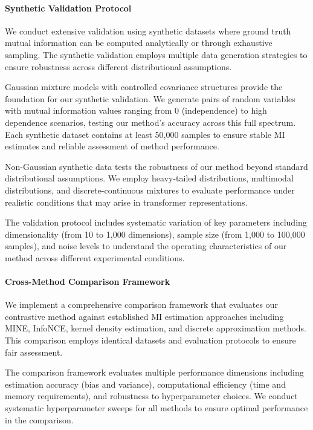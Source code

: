 \paragraph{Synthetic Validation Protocol}
We conduct extensive validation using synthetic datasets where ground truth mutual information can be computed analytically or through exhaustive sampling. The synthetic validation employs multiple data generation strategies to ensure robustness across different distributional assumptions.

Gaussian mixture models with controlled covariance structures provide the foundation for our synthetic validation. We generate pairs of random variables with mutual information values ranging from 0 (independence) to high dependence scenarios, testing our method's accuracy across this full spectrum. Each synthetic dataset contains at least 50,000 samples to ensure stable MI estimates and reliable assessment of method performance.

Non-Gaussian synthetic data tests the robustness of our method beyond standard distributional assumptions. We employ heavy-tailed distributions, multimodal distributions, and discrete-continuous mixtures to evaluate performance under realistic conditions that may arise in transformer representations.

The validation protocol includes systematic variation of key parameters including dimensionality (from 10 to 1,000 dimensions), sample size (from 1,000 to 100,000 samples), and noise levels to understand the operating characteristics of our method across different experimental conditions.

\paragraph{Cross-Method Comparison Framework}
We implement a comprehensive comparison framework that evaluates our contrastive method against established MI estimation approaches including MINE, InfoNCE, kernel density estimation, and discrete approximation methods. This comparison employs identical datasets and evaluation protocols to ensure fair assessment.

The comparison framework evaluates multiple performance dimensions including estimation accuracy (bias and variance), computational efficiency (time and memory requirements), and robustness to hyperparameter choices. We conduct systematic hyperparameter sweeps for all methods to ensure optimal performance in the comparison.

